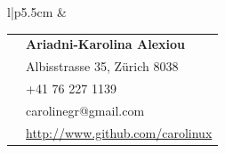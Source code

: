 \documentclass[10pt]{article} %
\begin{document}
\hfill
\begin{minipage}[t]{0.44\textwidth} %
\vspace{0pt} %


\colorbox{shade}{\textcolor{text1}{
        \begin{tabular}{l|p{5.5cm}}
             &
        \begin{tabular}{l|p{5cm}}
    \raisebox{0pt}{\Smiley} & \textbf{Ariadni-Karolina Alexiou} \\ %
    \raisebox{-1pt}{\textifsymbol{18}} & Albisstrasse 35, Z\"urich 8038 \\ %
    \raisebox{-1pt}{\Mobilefone} & +41 76 227 1139\\ %
    \raisebox{-1pt}{\Letter} & carolinegr@gmail.com \\ %
    \Keyboard & \href{http://www.github.com/carolinux}{http://www.github.com/carolinux} \\ %
        \end{tabular}  \\ %
\end{tabular}
}
}\\[10pt]








\end{minipage}
\end{document}
